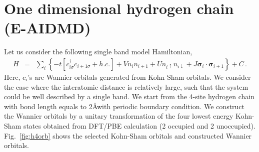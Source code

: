 \documentclass[aps, prb]{revtex4-1}
\renewcommand{\vec}[1]{\bm{#1}}
\begin{document}
\section{One dimensional hydrogen chain (E-AIDMD)}
Let us consider the following single band model Hamiltonian,
\begin{eqnarray}\label{eq:h4model}
H &=& \sum_{i}\left\{-t[c^{\dagger}_{i\sigma}c_{i+1\sigma} +h.c.]+ Vn_{i}n_{i+1} + Un_{i\uparrow}n_{i\downarrow}+ J\vec \sigma_{i}\cdot \vec \sigma_{i+1}\right\} + C\,.
\end{eqnarray}
Here, $c_{i}$'s are Wannier orbitals generated from Kohn-Sham orbitals. We consider the case where the interatomic distance is relatively large, such that the system could be well described by a single band.  We start from the 4-site hydrogen chain with bond length equals to 2\AA with periodic boundary condition. We construct the Wannier orbitals by a unitary transformation of the four lowest energy Kohn-Sham states obtained from DFT/PBE calculation (2 occupied and 2 unoccupied). Fig.~\ref{fig:h4orb} shows the selected Kohn-Sham orbitals and constructed Wannier orbitals. 
\end{document}
